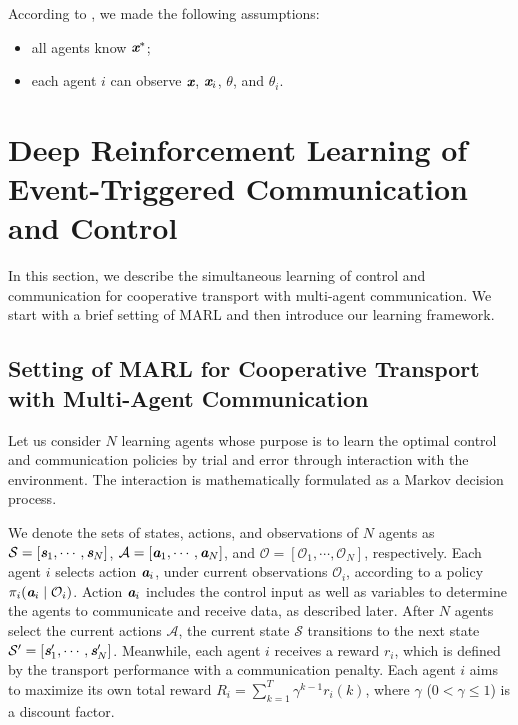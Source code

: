 \documentclass[letterpaper, 10 pt, conference]{ieeeconf} %
\begin{document}
According to \cite{Culbertson2018}, we made the following assumptions:
\begin{itemize}
\item all agents know $\textit{\textbf{x}}^{\ast}$;
\item each agent $i$ can observe $\textit{\textbf{x}}$, $\textit{\textbf{x}}_i$, $\theta$, and $\theta_i$.
\end{itemize}

\section{Deep Reinforcement Learning of Event-Triggered Communication and Control}

In this section, we describe the simultaneous learning of control and communication for cooperative transport with multi-agent communication. 
We start with a brief setting of MARL and then introduce our learning framework.

\subsection{Setting of MARL for Cooperative Transport with Multi-Agent Communication}
Let us consider $N$ learning agents whose purpose is to learn the optimal control and communication policies by trial and error through interaction with the environment.
The interaction is mathematically formulated as a Markov decision process.

We denote the sets of states, actions, and observations of $N$ agents as $\mathcal{S}=[\textit{\textbf{s}}_1,\cdots,\textit{\textbf{s}}_N]$, $\mathcal{A}=[\textit{\textbf{a}}_1,\cdots,\textit{\textbf{a}}_N]$, and $\mathcal{O}=[\mathcal{O}_1,\cdots,\mathcal{O}_N]$, respectively.
Each agent $i$ selects action $\textit{\textbf{a}}_i$, under current observations $\mathcal{O}_i$, according to a policy $\pi_i(\textit{\textbf{a}}_i\mid \mathcal{O}_i)$.
Action $\textit{\textbf{a}}_i$ includes the control input as well as variables to determine the agents to communicate and receive data, as described later.
After $N$ agents select the current actions $\mathcal{A}$, the current state $\mathcal{S}$ transitions to the next state $\mathcal{S}'=[\textit{\textbf{s}}'_1,\cdots,\textit{\textbf{s}}'_N]$.
Meanwhile, each agent $i$ receives a reward $r_i$, which is defined by the transport performance with a communication penalty.
Each agent $i$ aims to maximize its own total reward $R_i=\sum^T_{k=1}\gamma^{k-1}r_i(k)$, where $\gamma$ ($0<\gamma\le1$) is a discount factor.
\end{document}

